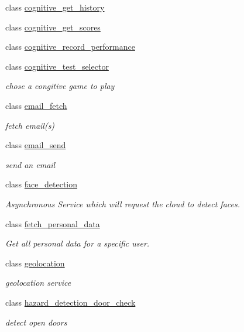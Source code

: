 \begin{DoxyCompactItemize}
class \hyperlink{classrapp_1_1cloud_1_1cognitive__get__history}{cognitive\-\_\-get\-\_\-history}
\item 
class \hyperlink{classrapp_1_1cloud_1_1cognitive__get__scores}{cognitive\-\_\-get\-\_\-scores}
\item 
class \hyperlink{classrapp_1_1cloud_1_1cognitive__record__performance}{cognitive\-\_\-record\-\_\-performance}
\item 
class \hyperlink{classrapp_1_1cloud_1_1cognitive__test__selector}{cognitive\-\_\-test\-\_\-selector}
\begin{DoxyCompactList}\small\item\em chose a congitive game to play \end{DoxyCompactList}\item 
class \hyperlink{classrapp_1_1cloud_1_1email__fetch}{email\-\_\-fetch}
\begin{DoxyCompactList}\small\item\em fetch email(s) \end{DoxyCompactList}\item 
class \hyperlink{classrapp_1_1cloud_1_1email__send}{email\-\_\-send}
\begin{DoxyCompactList}\small\item\em send an email \end{DoxyCompactList}\item 
class \hyperlink{classrapp_1_1cloud_1_1face__detection}{face\-\_\-detection}
\begin{DoxyCompactList}\small\item\em Asynchronous Service which will request the cloud to detect faces. \end{DoxyCompactList}\item 
class \hyperlink{classrapp_1_1cloud_1_1fetch__personal__data}{fetch\-\_\-personal\-\_\-data}
\begin{DoxyCompactList}\small\item\em Get all personal data for a specific user. \end{DoxyCompactList}\item 
class \hyperlink{classrapp_1_1cloud_1_1geolocation}{geolocation}
\begin{DoxyCompactList}\small\item\em geolocation service \end{DoxyCompactList}\item 
class \hyperlink{classrapp_1_1cloud_1_1hazard__detection__door__check}{hazard\-\_\-detection\-\_\-door\-\_\-check}
\begin{DoxyCompactList}\small\item\em detect open doors \end{DoxyCompactList}\item 

\end{DoxyCompactItemize}
